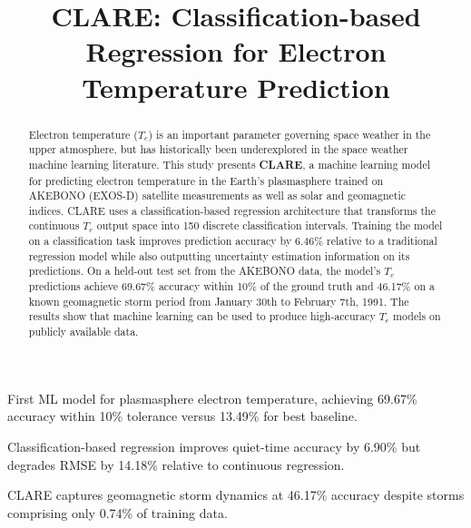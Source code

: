 \documentclass{agujournal2019}
\begin{document}
\title{CLARE: Classification-based Regression for Electron Temperature Prediction}




\begin{keypoints}
\item First ML model for plasmasphere electron temperature, achieving 69.67\% accuracy within 10\% tolerance versus 13.49\% for best baseline.
\item Classification-based regression improves quiet-time accuracy by 6.90\% but degrades RMSE by 14.18\% relative to continuous regression.
\item CLARE captures geomagnetic storm dynamics at 46.17\% accuracy despite storms comprising only 0.74\% of training data.
\end{keypoints}

\begin{abstract}

Electron temperature ($T_e$) is an important parameter governing space weather in the upper atmosphere, but has historically been underexplored in the space weather machine learning literature. This study presents \textbf{CLARE}, a machine learning model for predicting electron temperature in the Earth's plasmasphere trained on AKEBONO (EXOS-D) satellite measurements as well as solar and geomagnetic indices. CLARE uses a classification-based regression architecture that transforms the continuous $T_e$ output space into 150 discrete classification intervals. Training the model on a classification task improves prediction accuracy by 6.46\% relative to a traditional regression model while also outputting uncertainty estimation information on its predictions. On a held-out test set from the AKEBONO data, the model's $T_e$ predictions achieve 69.67\% accuracy within 10\% of the ground truth and 46.17\% on a known geomagnetic storm period from January 30th to February 7th, 1991. The results show that machine learning can be used to produce high-accuracy $T_e$ models on publicly available data.

\end{abstract}
\end{document}
